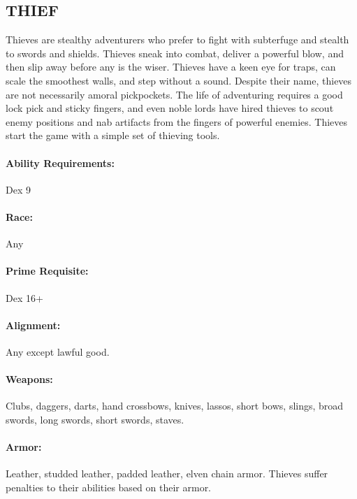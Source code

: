 \begin{multicols}{2}
\begin{minipage}{\columnwidth}
\end{minipage}

\subsection{THIEF}

Thieves are stealthy adventurers who prefer to fight with subterfuge and stealth to swords and shields.  Thieves sneak into combat, deliver a powerful blow, and then slip away before any is the wiser.  Thieves have a keen eye for traps, can scale the smoothest walls, and step without a sound.  Despite their name, thieves are not necessarily amoral pickpockets.  The life of adventuring requires a good lock pick and sticky fingers, and even noble lords have hired thieves to scout enemy positions and nab artifacts from the fingers of powerful enemies. Thieves start the game with a simple set of thieving tools.

\paragraph{Ability Requirements:} Dex 9

\paragraph{Race:} Any

\paragraph{Prime Requisite:} Dex 16+

\paragraph{Alignment:} Any except lawful good.

\paragraph{Weapons:} Clubs, daggers, darts, hand crossbows, knives, lassos, short bows, slings, broad swords, long swords, short swords, staves.

\paragraph{Armor:} Leather, studded leather, padded leather, elven chain armor.  Thieves suffer penalties to their abilities based on their armor.


\end{multicols}
